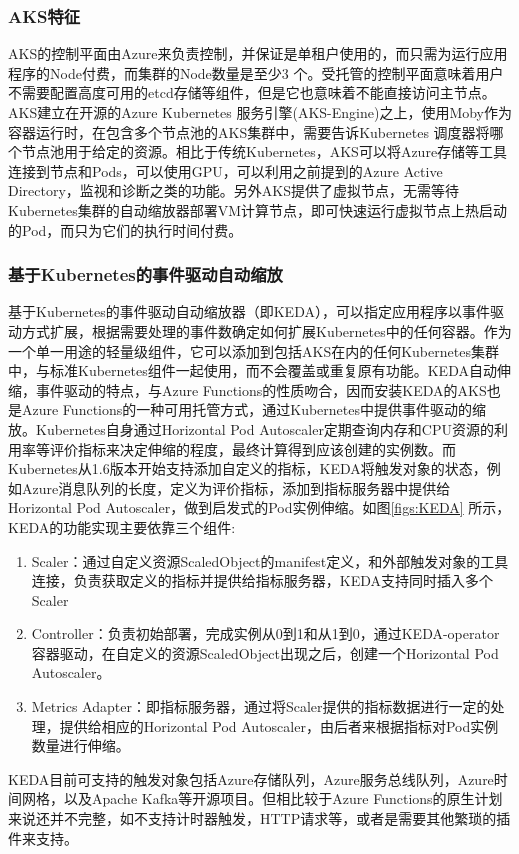 \subsubsection{AKS特征}
AKS的控制平面由Azure来负责控制，并保证是单租户使用的，而只需为运行应用程序的Node付费，而集群的Node数量是至少3 个。受托管的控制平面意味着用户不需要配置高度可用的etcd存储等组件，但是它也意味着不能直接访问主节点。AKS建立在开源的Azure Kubernetes 服务引擎(AKS-Engine)之上，使用Moby作为容器运行时，在包含多个节点池的AKS集群中，需要告诉Kubernetes 调度器将哪个节点池用于给定的资源。相比于传统Kubernetes，AKS可以将Azure存储等工具连接到节点和Pods，可以使用GPU，可以利用之前提到的Azure Active Directory，监视和诊断之类的功能。另外AKS提供了虚拟节点，无需等待Kubernetes集群的自动缩放器部署VM计算节点，即可快速运行虚拟节点上热启动的Pod，而只为它们的执行时间付费。

\subsubsection{基于Kubernetes的事件驱动自动缩放}
基于Kubernetes的事件驱动自动缩放器（即KEDA），可以指定应用程序以事件驱动方式扩展，根据需要处理的事件数确定如何扩展Kubernetes中的任何容器。作为一个单一用途的轻量级组件，它可以添加到包括AKS在内的任何Kubernetes集群中，与标准Kubernetes组件一起使用，而不会覆盖或重复原有功能。KEDA自动伸缩，事件驱动的特点，与Azure Functions的性质吻合，因而安装KEDA的AKS也是Azure Functions的一种可用托管方式，通过Kubernetes中提供事件驱动的缩放。Kubernetes自身通过Horizontal Pod Autoscaler定期查询内存和CPU资源的利用率等评价指标来决定伸缩的程度，最终计算得到应该创建的实例数。而Kubernetes从1.6版本开始支持添加自定义的指标，KEDA将触发对象的状态，例如Azure消息队列的长度，定义为评价指标，添加到指标服务器中提供给Horizontal Pod Autoscaler，做到启发式的Pod实例伸缩。如图\ref{figs:KEDA} 所示，KEDA的功能实现主要依靠三个组件:
\begin{enumerate}
	\item Scaler：通过自定义资源ScaledObject的manifest定义，和外部触发对象的工具连接，负责获取定义的指标并提供给指标服务器，KEDA支持同时插入多个Scaler
	\item Controller：负责初始部署，完成实例从0到1和从1到0，通过KEDA-operator容器驱动，在自定义的资源ScaledObject出现之后，创建一个Horizontal Pod Autoscaler。
	\item Metrics Adapter：即指标服务器，通过将Scaler提供的指标数据进行一定的处理，提供给相应的Horizontal Pod Autoscaler，由后者来根据指标对Pod实例数量进行伸缩。
\end{enumerate}
KEDA目前可支持的触发对象包括Azure存储队列，Azure服务总线队列，Azure时间网格，以及Apache Kafka等开源项目。但相比较于Azure Functions的原生计划来说还并不完整，如不支持计时器触发，HTTP请求等，或者是需要其他繁琐的插件来支持。
